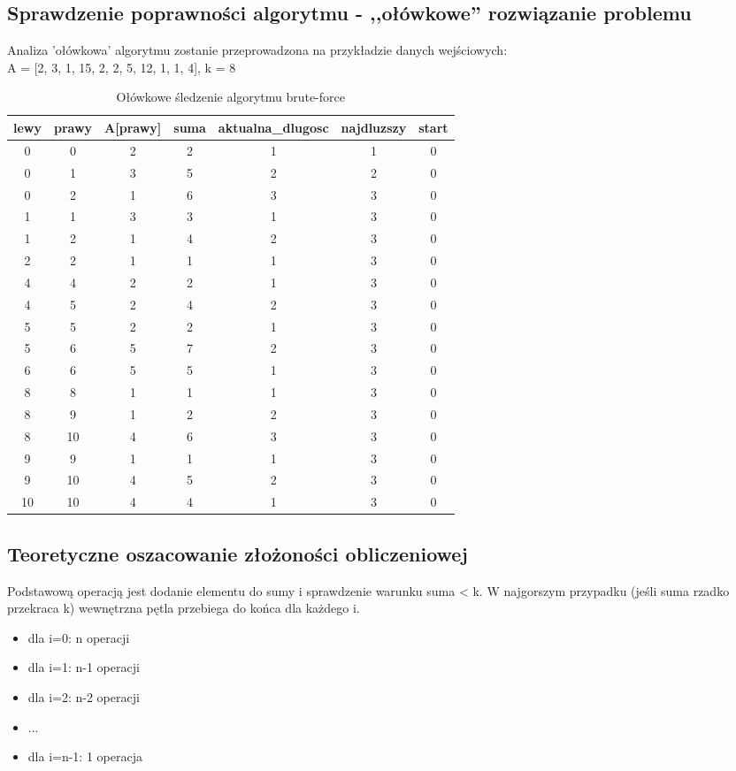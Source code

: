 \documentclass{article}
\begin{document}
\subsection{Sprawdzenie poprawności algorytmu - ,,ołówkowe'' rozwiązanie problemu}
Analiza 'ołówkowa' algorytmu zostanie przeprowadzona na przykładzie danych wejściowych: \\
A = [2, 3, 1, 15, 2, 2, 5, 12, 1, 1, 4], k = 8

\begin{table}[h!]
\centering
\begin{tabular}{|c|c|c|c|c|c|c|}
\hline
lewy & prawy & A[prawy] & suma & aktualna\_dlugosc & najdluzszy & start \\
\hline
0  & 0  & 2   & 2  & 1  & 1  & 0 \\
0  & 1  & 3   & 5  & 2  & 2  & 0 \\
0  & 2  & 1   & 6  & 3  & 3  & 0 \\
1  & 1  & 3   & 3  & 1  & 3  & 0 \\
1  & 2  & 1   & 4  & 2  & 3  & 0 \\
2  & 2  & 1   & 1  & 1  & 3  & 0 \\
4  & 4  & 2   & 2  & 1  & 3  & 0 \\
4  & 5  & 2   & 4  & 2  & 3  & 0 \\
5  & 5  & 2   & 2  & 1  & 3  & 0 \\
5  & 6  & 5   & 7  & 2  & 3  & 0 \\
6  & 6  & 5   & 5  & 1  & 3  & 0 \\
8  & 8  & 1   & 1  & 1  & 3  & 0 \\
8  & 9  & 1   & 2  & 2  & 3  & 0 \\
8  & 10 & 4   & 6  & 3  & 3  & 0 \\
9  & 9  & 1   & 1  & 1  & 3  & 0 \\
9  & 10 & 4   & 5  & 2  & 3  & 0 \\
10 & 10 & 4   & 4  & 1  & 3  & 0 \\
\hline
\end{tabular}
\caption{Ołówkowe śledzenie algorytmu brute-force}
\label{tab:brute_olowkowe}
\end{table}

\subsection{Teoretyczne oszacowanie złożoności obliczeniowej}
Podstawową operacją jest dodanie elementu do sumy i sprawdzenie warunku suma < k. W najgorszym przypadku (jeśli suma rzadko przekraca k) wewnętrzna pętla przebiega do końca dla każdego i.
\begin{itemize}
    \item dla i=0: n operacji
    \item dla i=1: n-1 operacji
    \item dla i=2: n-2 operacji
    \item ...
    \item dla i=n-1: 1 operacja
\end{itemize}
\end{document}

